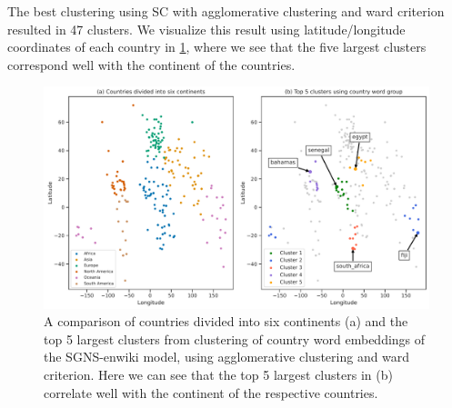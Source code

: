 The best clustering using SC with agglomerative clustering and ward criterion resulted in 47 clusters. We visualize this result using latitude/longitude coordinates of each country in \cref{fig:cluster-analysis-agglomerative-country-word-group-top-clusters}, where we see that the five largest clusters correspond well with the continent of the countries.
\begin{figure}[H]
    \centering
    \includegraphics[width=\textwidth]{thesis/figures/cluster-analysis-agglomerative-country-word-group-top-clusters.pdf}
    \caption{A comparison of countries divided into six continents (a) and the top 5 largest clusters from clustering of country word embeddings of the SGNS-enwiki model, using agglomerative clustering and ward criterion. Here we can see that the top 5 largest clusters in (b) correlate well with the continent of the respective countries.}
    \label{fig:cluster-analysis-agglomerative-country-word-group-top-clusters}
\end{figure}

